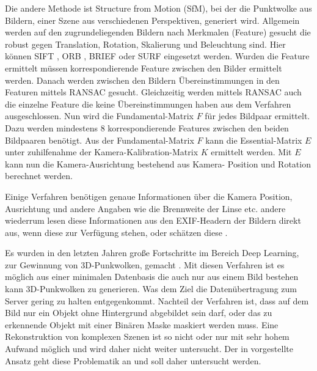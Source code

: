 \documentclass[12pt,titlepage, twoside]{article}
\begin{document}
Die andere Methode ist Structure from Motion (SfM), bei der die Punktwolke aus Bildern, einer Szene aus verschiedenen Perspektiven, generiert wird. 
Allgemein werden auf den zugrundeliegenden Bildern nach Merkmalen (Feature) gesucht die robust gegen Translation, Rotation, Skalierung und Beleuchtung sind. 
Hier können SIFT \cite{Sift}, ORB \cite{ORB}, BRIEF \cite{BRIEF} oder SURF \cite{SURF} eingesetzt werden.
Wurden die Feature ermittelt müssen korrespondierende Feature zwischen den Bilder ermittelt werden. 
Danach werden zwischen den Bildern Übereinstimmungen in den Featuren mittels RANSAC gesucht. Gleichzeitig werden mittels RANSAC auch die einzelne Feature die keine Übereinstimmungen haben aus dem Verfahren ausgeschlossen.
Nun wird die Fundamental-Matrix $F$ für jedes Bildpaar ermittelt. Dazu werden mindestens 8 korrespondierende Features zwischen den beiden Bildpaaren benötigt. 
Aus der Fundamental-Matrix $F$ kann die Essential-Matrix $E$ unter zuhilfenahme der Kamera-Kalibration-Matrix $K$ ermittelt werden. 
Mit $E$ kann nun die Kamera-Ausrichtung bestehend aus Kamera- Position und Rotation berechnet werden.


Einige Verfahren benötigen genaue Informationen über die Kamera Position, Ausrichtung und andere Angaben wie die Brennweite der Linse etc. 
andere wiederrum lesen diese Informationen aus den EXIF-Headern der Bildern direkt aus, wenn diese zur Verfügung stehen, oder schätzen diese \cite{ODM} \cite{schoenberger2016mvs}.

Es wurden in den letzten Jahren große Fortschritte im Bereich Deep Learning, zur Gewinnung von 3D-Punkwolken, gemacht \cite{fan2016point} \cite{tatarchenko2017octree} \cite{wang2018pixel2mesh}. 
Mit diesen Verfahren ist es möglich aus einer minimalen Datenbasis die auch nur aus einem Bild bestehen kann 3D-Punkwolken zu generieren. Was dem Ziel die Datenübertragung zum Server gering zu halten entgegenkommt.
Nachteil der Verfahren ist, dass auf dem Bild nur ein Objekt ohne Hintergrund abgebildet sein darf, oder das zu erkennende Objekt mit einer Binären Maske maskiert werden muss.
Eine Rekonstruktion von komplexen Szenen ist so nicht oder nur mit sehr hohem Aufwand möglich \cite{rs11222644} und wird daher nicht weiter untersucht. 
Der in \cite{rs11222644} vorgestellte Ansatz geht diese Problematik an und soll daher untersucht werden.
\end{document}
